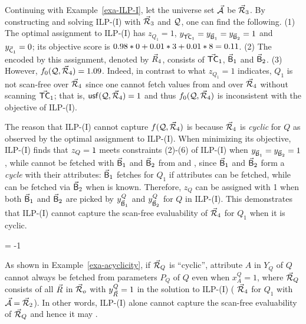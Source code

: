 \begin{example}\label{exa-acyclicity}
Continuing with Example~\ref{exa-ILP-I}, let
the universe set $\vec{{\mathcal A}}$   be $\vec{{\mathcal R}}_{3}$.
By constructing and solving ILP-(I) with $\vec{{\mathcal R}}_{3}$ and $\mathcal Q$,
one can find the following.
(1) The optimal assignment to ILP-(I) has
$z_{Q_{1}} = 1$, $y_{\vec{\protect\mathsf{TC}}_{1}} = y_{\vec{\protect\mathsf{B}}_{1}} =
y_{\vec{\protect\mathsf{B}}_{2}} = 1$ and $y_{\vec{\protect\mathsf{C}}_{1}} = 0$; its
objective score is $0.98*0\allowbreak +\allowbreak 0.01*3\allowbreak +\allowbreak 0.01*8\allowbreak =\allowbreak
0.11$.
(2) The \bds encoded by this assignment, denoted by $\vec{R}_{4}$,
consists of $\vec{\protect\mathsf{TC}}_{1}$, $\vec{\protect\mathsf{B}}_{1}$ and
$\vec{\protect\mathsf{B}}_{2}$.
(3) However, $f_{0}(\mathcal Q, \vec{{\mathcal R}}_{4}) = 1.09$. Indeed, in contrast to
what $z_{Q_{1}}= 1$ indicates, $Q_{1}$ is not scan-free over
$\vec{{\mathcal R}}_{4}$ since one cannot fetch  values from
 and  over $\vec{{\mathcal R}}_{4}$ without scanning
$\vec{\protect\mathsf{TC}}_{1}$; that is, ${\mathsf{usf}}(\mathcal Q, \vec{{\mathcal R}}_{4}) = 1$ and
thus $f_{0}(\mathcal Q, \vec{{\mathcal R}}_{4})$ is inconsistent with the
objective of ILP-(I).

\vspace{0.6ex}
The reason that ILP-(I) cannot capture $f(\mathcal Q, \vec{{\mathcal R}}_{4})$ is
because $\vec{{\mathcal R}}_{4}$ is {\em cyclic} for $Q$ as observed by the optimal
assignment to ILP-(I). When minimizing its objective, ILP-(I)
finds that $z_{Q}\allowbreak =\allowbreak 1$ meets constraints (2)-(6) of ILP-(I)
when $y_{\vec{\protect\mathsf{B}}_{1}}\allowbreak =\allowbreak y_{\vec{\protect\mathsf{B}}_{2}}\allowbreak =\allowbreak 1$, while
 cannot be fetched with $\vec{\protect\mathsf{B}}_{1}$ and
$\vec{\protect\mathsf{B}}_{2}$ from  and , since
$\vec{\protect\mathsf{B}}_{1}$ and $\vec{\protect\mathsf{B}}_{2}$ form a {\em cycle} with
their attributes: $\vec{\protect\mathsf{B}}_{1}$ fetches  for $Q_{1}$
if  attributes can be fetched, while  can be
fetched via $\vec{\protect\mathsf{B}}_{2}$ when  is known. Therefore,
$z_{Q}$ can be assigned with 1 when both $\vec{\protect\mathsf{B}}_{1}$ and
$\vec{\protect\mathsf{B}}_{2}$ are picked by $y_{\vec{\protect\mathsf{B}}_{1}}^{Q}$ and
$y_{\vec{\protect\mathsf{B}}_{2}}^{Q}$ for $Q$ in ILP-(I). This demonstrates that ILP-(I)
cannot capture the scan-free evaluability of
$\vec{{\mathcal R}}_{4}$ for $Q_{1}$ when it is cyclic.
\end{example}
\looseness = -1

As shown in Example~\ref{exa-acyclicity}, if \bs $\vec{{\mathcal R}}_{Q}$ is
``cyclic'',  attribute $A$ in $Y_{Q}$ of $Q$ cannot always be
fetched from parameters $P_{Q}$ of $Q$ even when $x_{A}^{Q} = 1$,
where $\vec{{\mathcal R}}_{Q}$ consists of all \bss $\vec{R}$ in $\vec{{\mathcal R}}_{o}$
with $y_{\vec{R}}^{Q} = 1$ in the solution to ILP-(I) (\ie
$\vec{{\mathcal R}}_{4}$ for $Q_{1}$ with $\vec{{\mathcal A}} = \vec{{\mathcal R}}_{2}$).
In other words, ILP-(I) alone cannot capture the scan-free
evaluability of $\vec{{\mathcal R}}_{Q}$ and hence it may . 

